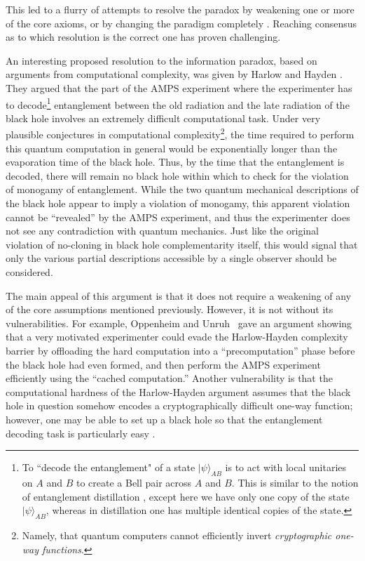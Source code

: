 \documentclass[a4paper,11pt]{article}
\theoremstyle{definition}
\newcommand{\ket}[1]{{|#1\rangle}}
\begin{document}
This led to a flurry of attempts to resolve the paradox by weakening one or more of the core axioms, or by changing the paradigm completely \cite{Chen:2014jwq, Maldacena:2013xja, Lloyd:2013bza, Papadodimas:2012aq, Mathur:2005zp, Giddings:2012gc,Hotta:2015,Nomura:2014woa,Nomura:2014voa,Nomura:2016qum}.
Reaching consensus as to which resolution is the correct one has proven challenging.

An interesting proposed resolution to the information paradox, based on arguments from computational complexity, was given by Harlow and Hayden \cite{Harlow:2013tf}. They argued that the part of the AMPS experiment where the experimenter has to decode\footnote{To ``decode the entanglement" of a state $\ket{\psi}_{AB}$ is to act with local unitaries on $A$ and $B$ to create a Bell pair across $A$ and $B$. This is similar to the notion of entanglement distillation \cite{bennettdistillation1996}, except here we have only one copy of the state $\ket{\psi}_{AB}$, whereas in distillation one has multiple identical copies of the state.
} entanglement between the old radiation and the late radiation of the black hole involves an extremely difficult computational task. Under very plausible conjectures in computational complexity\footnote{Namely, that quantum computers cannot efficiently invert \emph{cryptographic one-way functions}.}, the time required to perform this quantum computation in general would be exponentially longer than the evaporation time of the black hole. Thus, by the time that the entanglement is decoded, there will remain no black hole within which to check for the violation of monogamy of entanglement. While the two quantum mechanical descriptions of the black hole appear to imply a violation of monogamy, this apparent violation cannot be ``revealed'' by the AMPS experiment, and thus the experimenter does not see any contradiction with quantum mechanics. Just like the original violation of no-cloning in black hole complementarity itself, this would signal that only the various partial descriptions accessible by a single observer should be considered. 

The main appeal of this argument is that it does not require a weakening of any of the core assumptions mentioned previously. However, it is not without its vulnerabilities. For example, Oppenheim and Unruh~\cite{Oppenheim:2014gfa} gave an argument showing that a very motivated experimenter could evade the Harlow-Hayden complexity barrier by offloading the hard computation into a ``precomputation'' phase before the black hole had even formed, and then perform the AMPS experiment efficiently using the ``cached computation.'' Another vulnerability is that the computational hardness of the Harlow-Hayden argument assumes that the black hole in question somehow encodes a cryptographically difficult one-way function; however, one may be able to set up a black hole so that the entanglement decoding task is particularly easy \cite{AaronsonPC}.
\end{document}
